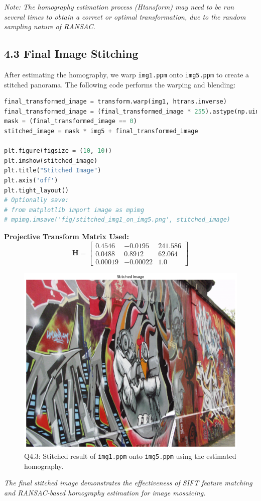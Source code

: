 \documentclass[10pt,a4paper,twocolumn]{article}
\begin{document}
\noindent\textit{Note: The homography estimation process (Htansform) may need to be run several times to obtain a correct or optimal transformation, due to the random sampling nature of RANSAC.}

\subsection*{4.3 Final Image Stitching}
After estimating the homography, we warp \texttt{img1.ppm} onto \texttt{img5.ppm} to create a stitched panorama. The following code performs the warping and blending:
\begin{lstlisting}[language=Python, style=mystyle]
final_transformed_image = transform.warp(img1, htrans.inverse)
final_transformed_image = (final_transformed_image * 255).astype(np.uint8)
mask = (final_transformed_image == 0)
stitched_image = mask * img5 + final_transformed_image

plt.figure(figsize = (10, 10))
plt.imshow(stitched_image)
plt.title("Stitched Image")
plt.axis('off')
plt.tight_layout()
# Optionally save:
# from matplotlib import image as mpimg
# mpimg.imsave('fig/stitched_img1_on_img5.png', stitched_image)
\end{lstlisting}

\vspace{0.3em}
\noindent\textbf{Projective Transform Matrix Used:}
\begin{equation*}
\mathbf{H} =
\begin{bmatrix}
 0.4546 & -0.0195 & 241.586 \\
 0.0488 & 0.8912 & 62.064 \\
 0.00019 & -0.00022 & 1.0
\end{bmatrix}
\end{equation*}
\begin{figure}[H]
    \centering
    \includegraphics[width=0.95\columnwidth]{fig/4.3.png}
    \caption{Q4.3: Stitched result of \texttt{img1.ppm} onto \texttt{img5.ppm} using the estimated homography.}
    \label{fig:q4_3}
\end{figure}

\noindent\textit{The final stitched image demonstrates the effectiveness of SIFT feature matching and RANSAC-based homography estimation for image mosaicing.}
\end{document}
